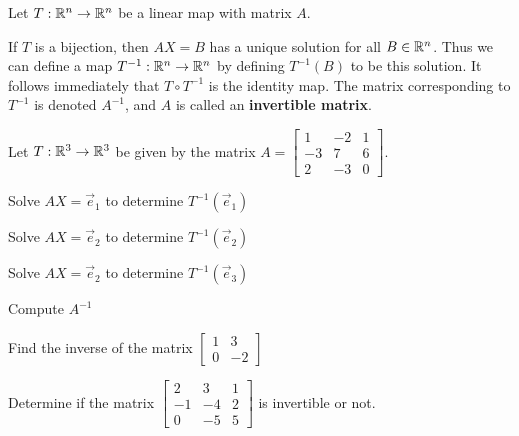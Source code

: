 
\begin{applicationActivities}{3}{23}

\begin{definition}
  Let $T: \mathbb{R}^n \rightarrow \mathbb{R}^n$ be a linear map with matrix $A$.

  If $T$ is a bijection, then $AX=B$ has a unique solution for all $B \in \mathbb{R}^n$.  Thus we can define a map $T^{-1} : \mathbb{R}^n \rightarrow \mathbb{R}^n$ by defining $T^{-1}(B)$ to be this solution.  It follows immediately that $T \circ T^{-1}$ is the identity map.  The matrix corresponding to $T^{-1}$ is denoted $A^{-1}$, and $A$ is called an {\bf invertible matrix}.

\end{definition}
\begin{activity}{20}
Let $T: \mathbb{R}^3 \rightarrow \mathbb{R}^3$ be given by the matrix $A=\begin{bmatrix} 1 & -2 & 1 \\ -3 & 7 & 6 \\ 2 & -3 & 0 \end{bmatrix}$.
  \begin{subactivity}
  Solve $AX=\vec{e}_1$ to determine $T^{-1}(\vec{e}_1)$
  \end{subactivity}
  \begin{subactivity}
   Solve $AX=\vec{e}_2$ to determine $T^{-1}(\vec{e}_2)$
  \end{subactivity}
  \begin{subactivity}
   Solve $AX=\vec{e}_2$ to determine $T^{-1}(\vec{e}_3)$
  \end{subactivity}
  \begin{subactivity}
  Compute $A^{-1}$
  \end{subactivity}
\end{activity}

\begin{activity}{15}
  Find the inverse of the matrix $\begin{bmatrix} 1 & 3 \\ 0 & -2 \end{bmatrix}$
\end{activity}

\begin{activity}{15}
Determine if the matrix $\begin{bmatrix} 2 & 3 & 1 \\ -1 & -4 & 2 \\ 0 & -5 & 5 \end{bmatrix}$ is invertible or not.
\end{activity}

\end{applicationActivities}

